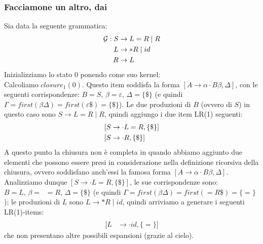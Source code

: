 \documentclass[class=book, crop=false, oneside, 12pt]{standalone}
\begin{document}
\subsubsection{Facciamone un altro, dai}
\label{ex:closure-lr1}
Sia data la seguente grammatica:
\begin{align}
    \mathcal{G}: S &\to L=R \mid R \\
    L &\to *R \mid id \nonumber \\ \notag
    R &\to L \notag
\end{align}
Inizializziamo lo stato 0 ponendo come suo kernel:
\begin{equation*}
    [S' \to \cdot S, \{\$\}]
\end{equation*}
Calcoliamo \(closure_1(0)\). Questo item soddisfa la forma \([A \rightarrow \alpha \cdot B \beta, \Delta]\), con le seguenti corrispondenze: \(B = S \texttt{, } \beta = \varepsilon \texttt{, } \Delta = \{\$\}\) (e quindi \(\Gamma = first(\beta \Delta) = first(\varepsilon \$) = \{\$\}\)).
Le due produzioni di \(B\) (ovvero di \(S\)) in questo caso sono \(S \to L=R \mid R\), quindi aggiungo i due item LR(1) seguenti:
\begin{align}
    \label{prod:production-L}
    [S &\to \cdot L = R, \{\$\}] \\
    [S &\to \cdot R, \{\$\}] \notag
\end{align}
A questo punto la chiusura non è completa in quando abbiamo aggiunto due elementi che possono essere presi in considerazione nella definizione ricorsiva della chiusura, ovvero soddisfano anch'essi la famosa forma \([A \rightarrow \alpha \cdot B \beta, \Delta]\).
Analizziamo dunque \([S \to \cdot L = R, \{\$\}]\), le sue corrispondenze sono: \(B = L \texttt{, } \beta = \; \; =R \texttt{, } \Delta = \{\$\}\) (e quindi \(\Gamma = first(\beta \Delta) = first(=R\$) = \{=\}\)); le produzioni di \(L\) sono \(L \to *R \mid id\), quindi arriviamo a generare i seguenti LR(1)-items:
\begin{align*}
    [L &\to \cdot *R, \{=\}] \\
    [L &\to \cdot id, \{=\}]
\end{align*}
che non presentano altre possibili espansioni (grazie al cielo).
\end{document}
